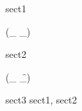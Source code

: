 \begin{zsection}
\SECTION sect1
\end{zsection}

\begin{zed}
   \leftassoc (\_ \e \_)
\end{zed}

\begin{zsection}
\SECTION sect2
\end{zsection}

\begin{zed}
   \rightassoc (\_ \f \_)
\end{zed}

\begin{zsection}
\SECTION sect3 \parents sect1, sect2
\end{zsection}
